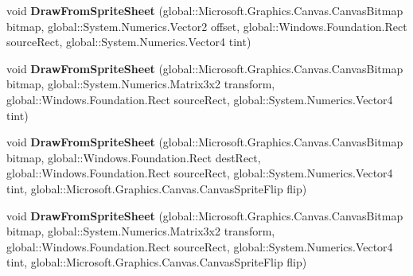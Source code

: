 \begin{DoxyCompactItemize}
\item 
\mbox{\label{interface_microsoft_1_1_graphics_1_1_canvas_1_1_i_canvas_sprite_batch_ac5ad0e2a3c2389b604549e6cb6590f9b}} 
void {\bfseries Draw\+From\+Sprite\+Sheet} (global\+::\+Microsoft.\+Graphics.\+Canvas.\+Canvas\+Bitmap bitmap, global\+::\+System.\+Numerics.\+Vector2 offset, global\+::\+Windows.\+Foundation.\+Rect source\+Rect, global\+::\+System.\+Numerics.\+Vector4 tint)
\item 
\mbox{\label{interface_microsoft_1_1_graphics_1_1_canvas_1_1_i_canvas_sprite_batch_a0c004051ad173e551e71d36d94ffd928}} 
void {\bfseries Draw\+From\+Sprite\+Sheet} (global\+::\+Microsoft.\+Graphics.\+Canvas.\+Canvas\+Bitmap bitmap, global\+::\+System.\+Numerics.\+Matrix3x2 transform, global\+::\+Windows.\+Foundation.\+Rect source\+Rect, global\+::\+System.\+Numerics.\+Vector4 tint)
\item 
\mbox{\label{interface_microsoft_1_1_graphics_1_1_canvas_1_1_i_canvas_sprite_batch_ad293d5fbb3ed75a7349a5af546ee5a77}} 
void {\bfseries Draw\+From\+Sprite\+Sheet} (global\+::\+Microsoft.\+Graphics.\+Canvas.\+Canvas\+Bitmap bitmap, global\+::\+Windows.\+Foundation.\+Rect dest\+Rect, global\+::\+Windows.\+Foundation.\+Rect source\+Rect, global\+::\+System.\+Numerics.\+Vector4 tint, global\+::\+Microsoft.\+Graphics.\+Canvas.\+Canvas\+Sprite\+Flip flip)
\item 
\mbox{\label{interface_microsoft_1_1_graphics_1_1_canvas_1_1_i_canvas_sprite_batch_a16ce9e3d6fcd3a35b2ca5ddc20b167fa}} 
void {\bfseries Draw\+From\+Sprite\+Sheet} (global\+::\+Microsoft.\+Graphics.\+Canvas.\+Canvas\+Bitmap bitmap, global\+::\+System.\+Numerics.\+Matrix3x2 transform, global\+::\+Windows.\+Foundation.\+Rect source\+Rect, global\+::\+System.\+Numerics.\+Vector4 tint, global\+::\+Microsoft.\+Graphics.\+Canvas.\+Canvas\+Sprite\+Flip flip)
\item 
\mbox{\label{interface_microsoft_1_1_graphics_1_1_canvas_1_1_i_canvas_sprite_batch_ac11b7ca2c7e66d7f79048004f3a75b53}} 

\end{DoxyCompactItemize}
